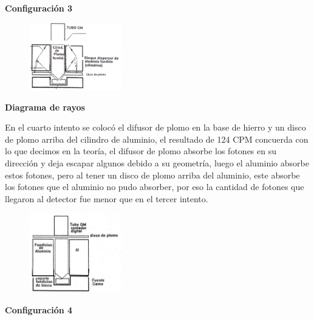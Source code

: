 \documentclass[a4paper]{article}
\begin{document}
    \begin{center}
        \textbf{Configuración 3}
    \end{center}

    \begin{figure}[h!]
        \centering
        \includegraphics[width=4cm]{../imagenes/imagen3b.png}
        \vspace{-5mm}
    \end{figure}

    \begin{center}
        \textbf{Diagrama de rayos}
    \end{center}

    \indent En el cuarto intento se colocó el difusor de plomo en la base de hierro y un disco de plomo arriba del cilindro de aluminio, el resultado de 124 CPM concuerda con lo que decimos en la teoría, el difusor de plomo absorbe los fotones en su dirección y deja escapar algunos debido a su geometría, luego el aluminio absorbe estos fotones, pero al tener un disco de plomo arriba del aluminio, este absorbe los fotones que el aluminio no pudo absorber, por eso la cantidad de fotones que llegaron al detector fue menor que en el tercer intento.

    \saltoPag

    \begin{figure}[h!]
        \centering
        \includegraphics[width=4cm]{../imagenes/imagen4.png}
        \vspace{-5mm}
    \end{figure}

    \begin{center}
        \textbf{Configuración 4}
    \end{center}
\end{document}
